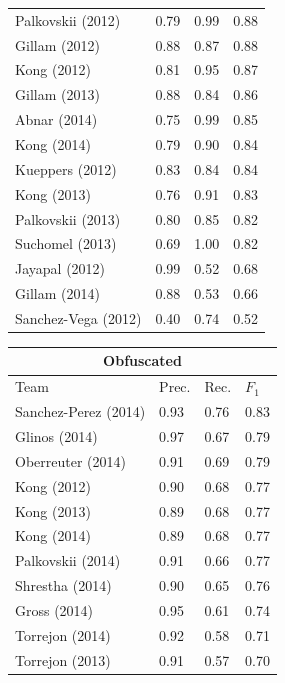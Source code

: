 \begin{table}[th]
\begin{tabularx}{.31\textwidth}{@{}l*{3}{X}}
Palkovskii (2012)    &         0.79 &   0.99 &  0.88 \\
Gillam (2012)        &         0.88 &   0.87 &  0.88 \\
Kong (2012)          &         0.81 &   0.95 &  0.87 \\
Gillam (2013)        &         0.88 &   0.84 &  0.86 \\
Abnar (2014)         &         0.75 &   0.99 &  0.85 \\
Kong (2014)          &         0.79 &   0.90 &  0.84 \\
Kueppers (2012)      &         0.83 &   0.84 &  0.84 \\
Kong (2013)          &         0.76 &   0.91 &  0.83 \\
Palkovskii (2013)    &         0.80 &   0.85 &  0.82 \\
Suchomel (2013)      &         0.69 &   1.00 &  0.82 \\
Jayapal (2012)       &         0.99 &   0.52 &  0.68 \\
Gillam (2014)        &         0.88 &   0.53 &  0.66 \\
Sanchez-Vega (2012)  &         0.40 &   0.74 &  0.52 \\
\bottomrule
\end{tabularx}
\hfill
\begin{tabularx}{.31\textwidth}{@{}l*{3}{X}}
\multicolumn{4}{c}{\bfseries Obfuscated} \\
\toprule
Team                 & Prec.      & Rec.   & $F_1$   \\
\midrule
Sanchez-Perez (2014) &       0.93 &   0.76 &  0.83 \\
Glinos (2014)        &       0.97 &   0.67 &  0.79 \\
Oberreuter (2014)    &       0.91 &   0.69 &  0.79 \\
Kong (2012)          &       0.90 &   0.68 &  0.77 \\
Kong (2013)          &       0.89 &   0.68 &  0.77 \\
Kong (2014)          &       0.89 &   0.68 &  0.77 \\
Palkovskii (2014)    &       0.91 &   0.66 &  0.77 \\
Shrestha (2014)      &       0.90 &   0.65 &  0.76 \\
Gross (2014)         &       0.95 &   0.61 &  0.74 \\
Torrejon (2014)      &       0.92 &   0.58 &  0.71 \\
Torrejon (2013)      &       0.91 &   0.57 &  0.70 \\

\end{tabularx}
\end{table}
